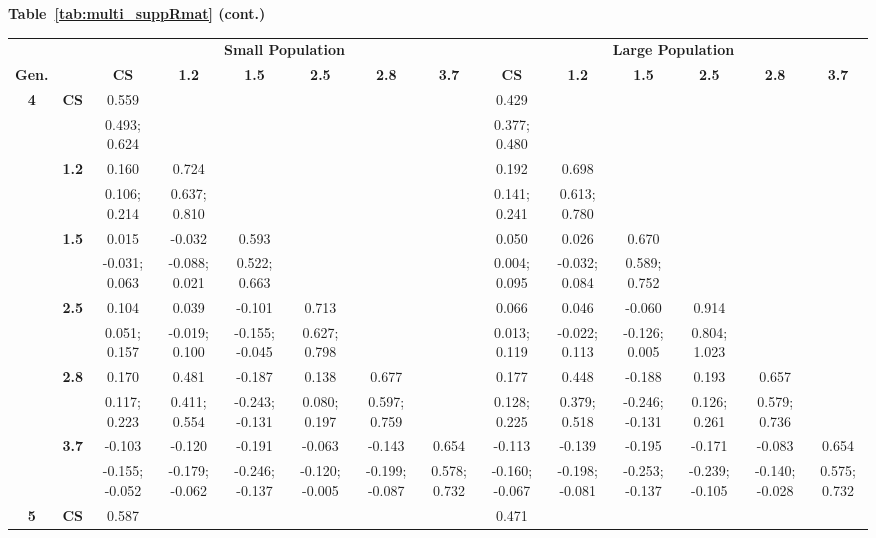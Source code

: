   \FloatBarrier
\begin{landscape}
\textbf{Table~\ref{tab:multi_suppRmat} (cont.)}
\begin{table}[!htp]
\renewcommand{\arraystretch}{0.8}
\scriptsize
\begin{center}
\begin{tabular}{>{\bfseries}c>{\bfseries}ccccccccccccc}
\toprule
&& \multicolumn{6}{c}{\textbf{Small Population}} & \multicolumn{6}{c}{\textbf{Large Population}}\\ [1.25ex]
Gen. && \textbf{CS} & \textbf{1.2} & \textbf{1.5} & \textbf{2.5} & \textbf{2.8} & \textbf{3.7} & 
\textbf{CS} & \textbf{1.2} & \textbf{1.5} & \textbf{2.5} & \textbf{2.8} & \textbf{3.7}\\
\midrule
4 & CS & 0.559 &  &  &  &  &  & 0.429 &  &  &  &  & \\
 &  & 0.493; 0.624 &  &  &  &  &  & 0.377; 0.480 &  &  &  &  & \\[0.7ex]
 & 1.2 & 0.160 & 0.724 &  &  &  &  & 0.192 & 0.698 &  &  &  & \\
 &  & 0.106; 0.214 & 0.637; 0.810 &  &  &  &  & 0.141; 0.241 & 0.613; 0.780 &  &  &  & \\[0.7ex]
 & 1.5 & 0.015 & -0.032 & 0.593 &  &  &  & 0.050 & 0.026 & 0.670 &  &  & \\
 &  & -0.031; 0.063 & -0.088; 0.021 & 0.522; 0.663 &  &  &  & 0.004; 0.095 & -0.032; 0.084 & 0.589; 0.752 &  &  & \\[0.7ex]
 & 2.5 & 0.104 & 0.039 & -0.101 & 0.713 &  &  & 0.066 & 0.046 & -0.060 & 0.914 &  & \\
 &  & 0.051; 0.157 & -0.019; 0.100 & -0.155; -0.045 & 0.627; 0.798 &  &  & 0.013; 0.119 & -0.022; 0.113 & -0.126; 0.005 & 0.804; 1.023 &  & \\[0.7ex]
 & 2.8 & 0.170 & 0.481 & -0.187 & 0.138 & 0.677 &  & 0.177 & 0.448 & -0.188 & 0.193 & 0.657 & \\
 &  & 0.117; 0.223 & 0.411; 0.554 & -0.243; -0.131 & 0.080; 0.197 & 0.597; 0.759 &  & 0.128; 0.225 & 0.379; 0.518 & -0.246; -0.131 & 0.126; 0.261 & 0.579; 0.736 & \\[0.7ex]
 & 3.7 & -0.103 & -0.120 & -0.191 & -0.063 & -0.143 & 0.654 & -0.113 & -0.139 & -0.195 & -0.171 & -0.083 & 0.654\\
 &  & -0.155; -0.052 & -0.179; -0.062 & -0.246; -0.137 & -0.120; -0.005 & -0.199; -0.087 & 0.578; 0.732 & -0.160; -0.067 & -0.198; -0.081 & -0.253; -0.137 & -0.239; -0.105 & -0.140; -0.028 & 0.575; 0.732\\[0.7ex]
 \midrule
5 & CS & 0.587 &  &  &  &  &  & 0.471 &  &  &  &  & \\

\end{tabular}
\end{center}
\end{table}
\end{landscape}
